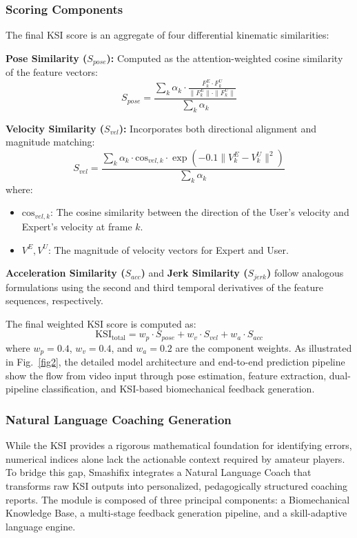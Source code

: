 \documentclass[pdflatex,sn-mathphys-num]{sn-jnl}%
\theoremstyle{thmstyleone}%
\theoremstyle{thmstyletwo}%
\theoremstyle{thmstylethree}%
\begin{document}
\subsubsection{Scoring Components}
The final KSI score is an aggregate of four differential kinematic similarities:

\textbf{Pose Similarity ($S_{pose}$):} Computed as the attention-weighted cosine similarity of the feature vectors:
\begin{equation}
S_{pose} = \frac{\sum_{k}\alpha_{k} \cdot \frac{F_k^E \cdot F_k^U}{\|F_k^E\| \cdot \|F_k^U\|}}{\sum_{k}\alpha_{k}}
\end{equation}

\textbf{Velocity Similarity ($S_{vel}$):} Incorporates both directional alignment and magnitude matching:
\begin{equation}
S_{vel} = \frac{\sum_{k}\alpha_{k} \cdot \text{cos}_{vel,k} \cdot \exp(-0.1\|V_k^E - V_k^U\|^2)}{\sum_{k}\alpha_{k}}
\end{equation}
\noindent where:
\begin{itemize}
    \item $\text{cos}_{vel,k}$: The cosine similarity between the direction of the User's velocity and Expert's velocity at frame $k$.
    \item $V^E, V^U$: The magnitude of velocity vectors for Expert and User.
\end{itemize}

\textbf{Acceleration Similarity ($S_{acc}$)} and \textbf{Jerk Similarity ($S_{jerk}$)} follow analogous formulations using the second and third temporal derivatives of the feature sequences, respectively.

The final weighted KSI score is computed as:
\begin{equation}
\text{KSI}_{\text{total}} = w_p \cdot S_{pose} + w_v \cdot S_{vel} + w_a \cdot S_{acc}
\end{equation}
\noindent where $w_p = 0.4$, $w_v = 0.4$, and $w_a = 0.2$ are the component weights.
As illustrated in Fig.~\ref{fig2}, the detailed model architecture and end-to-end prediction pipeline show the flow from video input through pose estimation, feature extraction, dual-pipeline classification, and KSI-based biomechanical feedback generation.


\subsubsection{Natural Language Coaching Generation}
While the KSI provides a rigorous mathematical foundation for identifying errors, numerical indices alone lack the actionable context required by amateur players. To bridge this gap, Smashifix integrates a Natural Language Coach that transforms raw KSI outputs into personalized, pedagogically structured coaching reports. The module is composed of three principal components: a Biomechanical Knowledge Base, a multi-stage feedback generation pipeline, and a skill-adaptive language engine.
\end{document}
